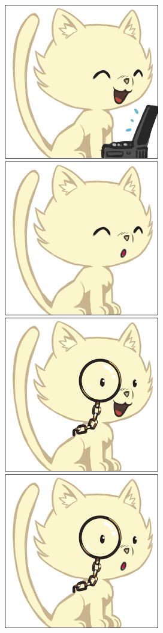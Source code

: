 \documentclass[a4paper, 12pt]{article}
\begin{document}
  \includegraphics[scale=0.45]{out/37.png}
  \includegraphics[scale=0.45]{out/4.png}
  \includegraphics[scale=0.45]{out/7.png}
  \includegraphics[scale=0.45]{out/10.png}
\end{document}

